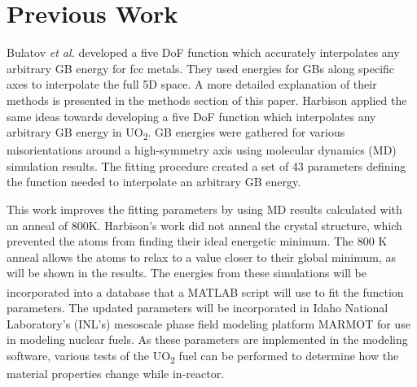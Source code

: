 \documentclass[12pt]{report}
\begin{document}
\section{Previous Work}
Bulatov \emph{et al.}\cite{bulatov2014} developed a five DoF function which accurately interpolates any arbitrary GB energy for fcc metals.  They used energies for GBs along specific axes to interpolate the full 5D space.  A more detailed explanation of their methods is presented in the methods section of this paper.  Harbison\cite{harbison2015} applied the same ideas towards developing a five DoF function which interpolates any arbitrary GB energy in UO\textsubscript{2}.  GB energies were gathered for various misorientations around a high-symmetry axis using molecular dynamics (MD) simulation results.  The fitting procedure created a set of 43 parameters defining the function needed to interpolate an arbitrary GB energy.

This work improves the fitting parameters by using MD results calculated with an anneal of 800K.  Harbison's work did not anneal the crystal structure\cite{harbison2015}, which prevented the atoms from finding their ideal energetic minimum.  The 800 K anneal allows the atoms to relax to a value closer to their global minimum, as will be shown in the results.  The energies from these simulations will be incorporated into a database that a MATLAB\textsuperscript{\textregistered} script will use to fit the function parameters.  The updated parameters will be incorporated in Idaho National Laboratory's (INL's) mesoscale phase field modeling platform MARMOT for use in modeling nuclear fuels.  As these parameters are implemented in the modeling software, various tests of the UO\textsubscript{2} fuel can be performed to determine how the material properties change while in-reactor. 


\end{document}
